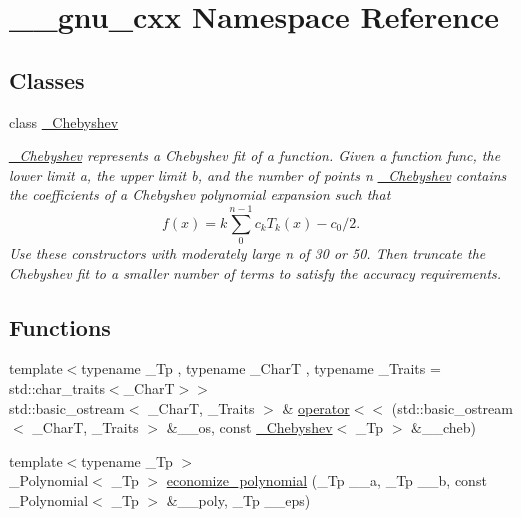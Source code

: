\hypertarget{namespace____gnu__cxx}{}\section{\+\_\+\+\_\+gnu\+\_\+cxx Namespace Reference}
\label{namespace____gnu__cxx}
\subsection*{Classes}
\begin{DoxyCompactItemize}
\item 
class \hyperlink{class____gnu__cxx_1_1__Chebyshev}{\+\_\+\+Chebyshev}
\begin{DoxyCompactList}\small\item\em \hyperlink{class____gnu__cxx_1_1__Chebyshev}{\+\_\+\+Chebyshev} represents a Chebyshev fit of a function. Given a function {\ttfamily func}, the lower limit {\ttfamily a}, the upper limit {\ttfamily b}, and the number of points {\ttfamily n} \hyperlink{class____gnu__cxx_1_1__Chebyshev}{\+\_\+\+Chebyshev} contains the coefficients of a Chebyshev polynomial expansion such that \[ f(x) = k\sum_{0}^{n-1} c_k T_k(x) - c_0/2. \] Use these constructors with moderately large n of 30 or 50. Then truncate the Chebyshev fit to a smaller number of terms to satisfy the accuracy requirements. \end{DoxyCompactList}\end{DoxyCompactItemize}
\subsection*{Functions}
\begin{DoxyCompactItemize}
\item 
{\footnotesize template$<$typename \+\_\+\+Tp , typename \+\_\+\+CharT , typename \+\_\+\+Traits  = std\+::char\+\_\+traits$<$\+\_\+\+Char\+T$>$$>$ }\\std\+::basic\+\_\+ostream$<$ \+\_\+\+CharT, \+\_\+\+Traits $>$ \& \hyperlink{namespace____gnu__cxx_ae90394e47a70b69b61486e43a7c13116}{operator$<$$<$} (std\+::basic\+\_\+ostream$<$ \+\_\+\+CharT, \+\_\+\+Traits $>$ \&\+\_\+\+\_\+os, const \hyperlink{class____gnu__cxx_1_1__Chebyshev}{\+\_\+\+Chebyshev}$<$ \+\_\+\+Tp $>$ \&\+\_\+\+\_\+cheb)
\item 
{\footnotesize template$<$typename \+\_\+\+Tp $>$ }\\\+\_\+\+Polynomial$<$ \+\_\+\+Tp $>$ \hyperlink{namespace____gnu__cxx_a917fd750f0e3fb9fd440bf3ecf72c97b}{economize\+\_\+polynomial} (\+\_\+\+Tp \+\_\+\+\_\+a, \+\_\+\+Tp \+\_\+\+\_\+b, const \+\_\+\+Polynomial$<$ \+\_\+\+Tp $>$ \&\+\_\+\+\_\+poly, \+\_\+\+Tp \+\_\+\+\_\+eps)
\end{DoxyCompactItemize}


